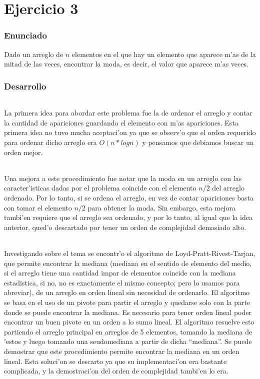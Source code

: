 \part{Ejercicio 3}
\section{Enunciado}
Dado un arreglo de $n$ elementos en el que hay un elemento que aparece m'as de la mitad de las 
veces, encontrar la moda, es decir, el valor que aparece m'as veces.

\section{Desarrollo}
\paragraph{}
La primera idea para abordar este problema fue la de ordenar el arreglo y contar la cantidad 
de apariciones guardando el elemento con m'as apariciones. Esta primera idea no tuvo mucha 
aceptaci'on ya que se observ'o que el orden requerido para ordenar dicho arreglo era $O(n*log n)$ y pensamos que debiamos buscar un orden mejor.
\paragraph{}
Una mejora a este procedimiento fue notar que la moda en un arreglo con las caracter'isticas
dadas por el problema coincide con el elemento $n/2$ del arreglo ordenado. Por lo tanto, 
si se ordena el arreglo, en vez de contar apariciones basta con tomar el elemento $n/2$ para 
obtener la moda. Sin embargo, esta mejora tambi'en requiere que el arreglo sea ordenado, y por
lo tanto, al igual que la idea anterior, qued'o descartado por tener un orden de complejidad
demasiado alto.
\paragraph{}
Investigando sobre el tema se encontr'o el algoritmo de Loyd-Pratt-Rivest-Tarjan, que permite 
encontrar la mediana (mediana en el sentido de elemento del medio, si el arreglo tiene una cantidad impar de elementos coincide con la mediana estadistica, si no, no es exactamente el mismo concepto; pero lo usamos para abreviar), de un arreglo en orden lineal sin necesidad de ordenarlo. El algoritmo 
se basa en el uso de un pivote para partir el arreglo y quedarse solo con la parte donde se 
puede encontrar la mediana. Es necesario para tener orden lineal poder encontrar un buen pivote 
en un orden a lo sumo lineal. El algoritmo resuelve esto partiendo el arreglo principal en arreglos
de 5 elementos, tomando la mediana de 'estos y luego tomando una seudomediana a partir de dicha ``mediana''. 
Se puede demostrar que este procedimiento permite encontrar la mediana en un orden lineal. Esta 
soluci'on se descarto ya que su implementaci'on era bastante complicada, y la demostraci'on del orden de complejidad tambi'en lo era.
